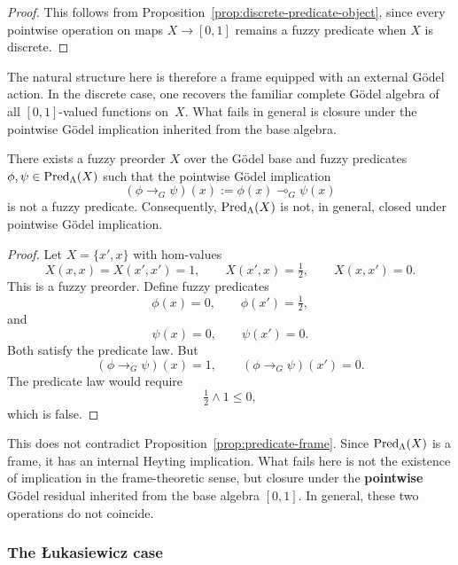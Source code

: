 \begin{proof}
    This follows from Proposition~\ref{prop:discrete-predicate-object}, since every pointwise operation on maps \(X\to[0,1]\) remains a fuzzy predicate when \(X\) is discrete.
\end{proof}

The natural structure here is therefore a frame equipped with an external G\"odel action. In the discrete case, one recovers the familiar complete G\"odel algebra of all \([0,1]\)-valued functions on~\(X\). What fails in general is closure under the pointwise G\"odel implication inherited from the base algebra.

\begin{proposition}
\label{prop:godel-pointwise-implication-not-closed}
    There exists a fuzzy preorder \(X\) over the G\"odel base and fuzzy predicates \(\phi,\psi\in \mathrm{Pred}_\Lambda(X)\) such that the pointwise G\"odel implication
    \[
        (\phi\to_G \psi)(x):=\phi(x)\multimap_G \psi(x)
    \]
    is not a fuzzy predicate. Consequently, \(\mathrm{Pred}_\Lambda(X)\) is not, in general, closed under pointwise G\"odel implication.
\end{proposition}

\begin{proof}
    Let \(X=\{x',x\}\) with hom-values
    \[
        X(x,x)=X(x',x')=1,
        \qquad
        X(x',x)=\tfrac12,
        \qquad
        X(x,x')=0.
    \]
    This is a fuzzy preorder. Define fuzzy predicates
    \[
        \phi(x)=0,
        \qquad
        \phi(x')=\tfrac12,
    \]
    and
    \[
        \psi(x)=0,
        \qquad
        \psi(x')=0.
    \]
    Both satisfy the predicate law. But
    \[
        (\phi\to_G \psi)(x)=1,
        \qquad
        (\phi\to_G \psi)(x')=0.
    \]
    The predicate law would require
    \[
        \tfrac12\wedge 1\leq 0,
    \]
    which is false.
\end{proof}

\begin{remark}
\label{rem:godel-frame-vs-pointwise-implication}
    This does not contradict Proposition~\ref{prop:predicate-frame}. Since \(\mathrm{Pred}_\Lambda(X)\) is a frame, it has an internal Heyting implication. What fails here is not the existence of implication in the frame-theoretic sense, but closure under the \textbf{pointwise} G\"odel residual inherited from the base algebra \([0,1]\). In general, these two operations do not coincide.
\end{remark}

\subsubsection{The {\L}ukasiewicz case}

